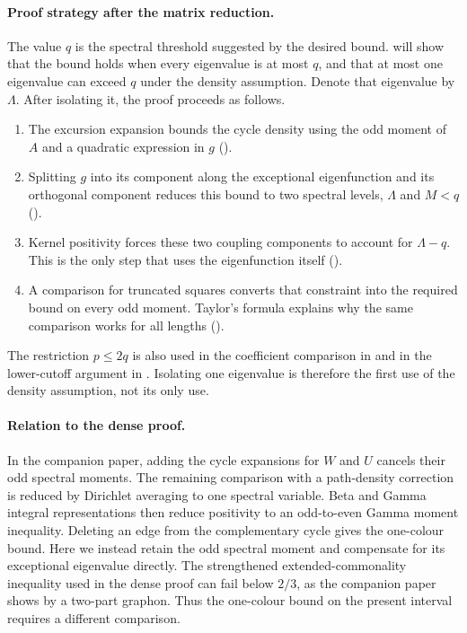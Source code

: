 \documentclass[11pt]{article}
\numberwithin{equation}{section}
\begin{document}
\paragraph{Proof strategy after the matrix reduction.}
The value $q$ is the spectral threshold suggested by the desired bound.
 will show that the bound holds when every
eigenvalue is at most $q$, and that at most one eigenvalue can exceed
$q$ under the density assumption. Denote that eigenvalue by $\Lambda$.
After isolating it, the proof proceeds as follows.
\begin{enumerate}[label=\arabic*.,leftmargin=*]
 \item The excursion expansion bounds the cycle density using the
 odd moment of $A$ and a quadratic expression in $g$
 ().
 \item Splitting $g$ into its component along the exceptional
 eigenfunction and its orthogonal component reduces this bound to
 two spectral levels, $\Lambda$ and $M<q$
 ().
 \item Kernel positivity forces these two coupling components to
 account for $\Lambda-q$. This is the only step that uses the
 eigenfunction itself ().
 \item A comparison for truncated squares converts that constraint
 into the required bound on every odd moment. Taylor's formula
 explains why the same comparison works for all lengths
 ().
\end{enumerate}
The restriction $p\le2q$ is also used in the coefficient comparison
in  and in the lower-cutoff argument in
. Isolating one eigenvalue is therefore the
first use of the density assumption, not its only use.

\paragraph{Relation to the dense proof.}
In the companion paper, adding the cycle expansions for $W$ and $U$
cancels their odd spectral moments. The remaining comparison with a
path-density correction is reduced by Dirichlet averaging to one
spectral variable. Beta and Gamma integral representations then
reduce positivity to an odd-to-even Gamma moment inequality.
Deleting an edge from the complementary cycle gives the one-colour
bound. Here we instead retain the odd spectral moment and compensate
for its exceptional eigenvalue directly. The strengthened
extended-commonality inequality used in the dense proof can fail
below $2/3$, as the companion paper shows by a two-part graphon.
Thus the one-colour bound on the present interval requires a
different comparison.
\end{document}
